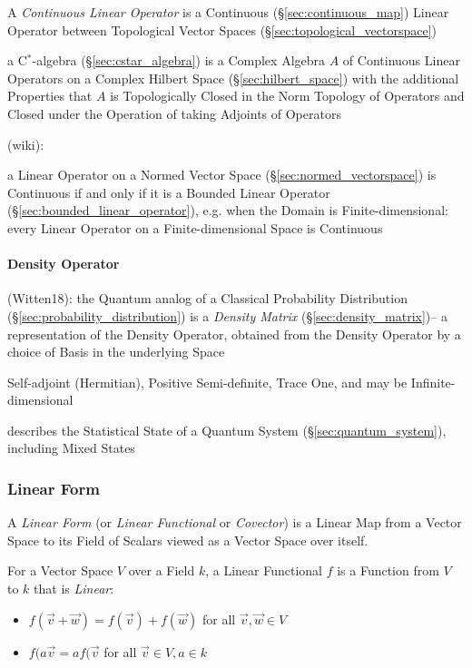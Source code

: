 A \emph{Continuous Linear Operator} is a Continuous
(\S\ref{sec:continuous_map}) Linear Operator between Topological
Vector Spaces (\S\ref{sec:topological_vectorspace})

a C$^*$-algebra (\S\ref{sec:cstar_algebra}) is a Complex Algebra $A$
of Continuous Linear Operators on a Complex Hilbert Space
(\S\ref{sec:hilbert_space}) with the additional Properties that $A$ is
Topologically Closed in the Norm Topology of Operators and Closed
under the Operation of taking Adjoints of Operators

(wiki):

a Linear Operator on a Normed Vector Space
(\S\ref{sec:normed_vectorspace}) is Continuous if and only if it is a
Bounded Linear Operator (\S\ref{sec:bounded_linear_operator}), e.g.
when the Domain is Finite-dimensional: every Linear Operator on a
Finite-dimensional Space is Continuous



\paragraph{Density Operator}\label{sec:density_operator}\hfill

(Witten18): the Quantum analog of a Classical Probability Distribution
(\S\ref{sec:probability_distribution}) is a \emph{Density Matrix}
(\S\ref{sec:density_matrix})-- a representation of the Density Operator,
obtained from the Density Operator by a choice of Basis in the underlying Space

Self-adjoint (Hermitian), Positive Semi-definite, Trace One, and may be
Infinite-dimensional

describes the Statistical State of a Quantum System
(\S\ref{sec:quantum_system}), including Mixed States



\subsubsection{Linear Form}\label{sec:linear_form}

A \emph{Linear Form} (or \emph{Linear Functional} or \emph{Covector}) is a
Linear Map from a Vector Space to its Field of Scalars viewed as a Vector Space
over itself.

For a Vector Space $V$ over a Field $k$, a Linear Functional $f$ is a Function
from $V$ to $k$ that is \emph{Linear}:
\begin{itemize}
\item $f(\vec{v} + \vec{w}) = f(\vec{v}) + f(\vec{w})$ for all $\vec{v},
  \vec{w} \in V$
\item $f(a\vec{v} = af(\vec{v}$ for all $\vec{v} \in V, a \in k$
\end{itemize}

